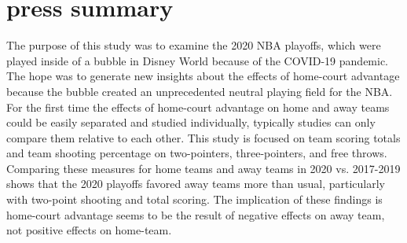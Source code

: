 \documentclass[10pt]{article}
\begin{document}
\section*{press summary}
The purpose of this study was to examine the 2020 NBA playoffs, which were played inside of a bubble in Disney World because of the COVID-19 pandemic. The hope was to generate new insights about the effects of home-court advantage because the bubble created an unprecedented neutral playing field for the NBA. For the first time the effects of home-court advantage on home and away teams could be easily separated and studied individually, typically studies can only compare them relative to each other. This study is focused on team scoring totals and team shooting percentage on two-pointers, three-pointers, and free throws. Comparing these measures for home teams and away teams in 2020 vs. 2017-2019 shows that the 2020 playoffs favored away teams more than usual, particularly with two-point shooting and total scoring. The implication of these findings is home-court advantage seems to be the result of negative effects on away team, not positive effects on home-team.
\end{document}
